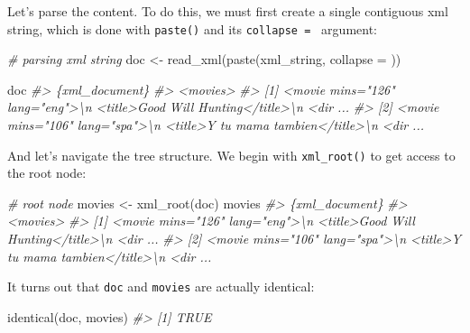 \documentclass[
]{book}
\newenvironment{Shaded}{\begin{snugshade}}{\end{snugshade}}
\newcommand{\AttributeTok}[1]{\textcolor[rgb]{0.77,0.63,0.00}{#1}}
\newcommand{\CommentTok}[1]{\textcolor[rgb]{0.56,0.35,0.01}{\textit{#1}}}
\newcommand{\FunctionTok}[1]{\textcolor[rgb]{0.00,0.00,0.00}{#1}}
\newcommand{\NormalTok}[1]{#1}
\newcommand{\OtherTok}[1]{\textcolor[rgb]{0.56,0.35,0.01}{#1}}
\newcommand{\StringTok}[1]{\textcolor[rgb]{0.31,0.60,0.02}{#1}}
\begin{document}
Let's parse the content. To do this, we must first create a single contiguous
xml string, which is done with \texttt{paste()} and its \texttt{collapse\ =\ \textquotesingle{}\textquotesingle{}} argument:

\begin{Shaded}
\begin{Highlighting}[]
\CommentTok{\# parsing xml string}
\NormalTok{doc }\OtherTok{\textless{}{-}} \FunctionTok{read\_xml}\NormalTok{(}\FunctionTok{paste}\NormalTok{(xml\_string, }\AttributeTok{collapse =} \StringTok{\textquotesingle{}\textquotesingle{}}\NormalTok{))}

\NormalTok{doc}
\CommentTok{\#\textgreater{} \{xml\_document\}}
\CommentTok{\#\textgreater{} \textless{}movies\textgreater{}}
\CommentTok{\#\textgreater{} [1] \textless{}movie mins="126" lang="eng"\textgreater{}\textbackslash{}n  \textless{}title\textgreater{}Good Will Hunting\textless{}/title\textgreater{}\textbackslash{}n  \textless{}dir ...}
\CommentTok{\#\textgreater{} [2] \textless{}movie mins="106" lang="spa"\textgreater{}\textbackslash{}n  \textless{}title\textgreater{}Y tu mama tambien\textless{}/title\textgreater{}\textbackslash{}n  \textless{}dir ...}
\end{Highlighting}
\end{Shaded}

And let's navigate the tree structure. We begin with \texttt{xml\_root()} to get
access to the root node:

\begin{Shaded}
\begin{Highlighting}[]
\CommentTok{\# root node}
\NormalTok{movies }\OtherTok{\textless{}{-}} \FunctionTok{xml\_root}\NormalTok{(doc)}
\NormalTok{movies}
\CommentTok{\#\textgreater{} \{xml\_document\}}
\CommentTok{\#\textgreater{} \textless{}movies\textgreater{}}
\CommentTok{\#\textgreater{} [1] \textless{}movie mins="126" lang="eng"\textgreater{}\textbackslash{}n  \textless{}title\textgreater{}Good Will Hunting\textless{}/title\textgreater{}\textbackslash{}n  \textless{}dir ...}
\CommentTok{\#\textgreater{} [2] \textless{}movie mins="106" lang="spa"\textgreater{}\textbackslash{}n  \textless{}title\textgreater{}Y tu mama tambien\textless{}/title\textgreater{}\textbackslash{}n  \textless{}dir ...}
\end{Highlighting}
\end{Shaded}

It turns out that \texttt{doc} and \texttt{movies} are actually identical:

\begin{Shaded}
\begin{Highlighting}[]
\FunctionTok{identical}\NormalTok{(doc, movies)}
\CommentTok{\#\textgreater{} [1] TRUE}
\end{Highlighting}
\end{Shaded}
\end{document}

